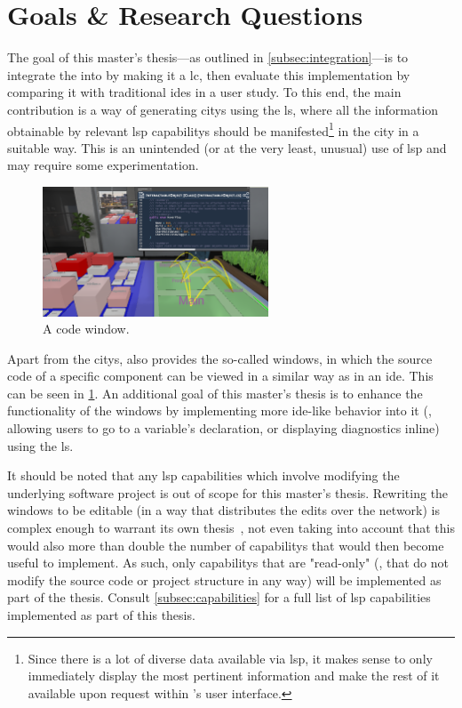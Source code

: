 \documentclass[../thesis]{subfiles}
\begin{document}
\section{Goals \& Research Questions}\label{sec:goals}
The goal of this master's thesis---as outlined in \cref{subsec:integration}---is to integrate the  into \SEE{} by making it a \gls{lc}, then evaluate this implementation by comparing it with traditional \glspl{ide} in a user study.
To this end, the main contribution is a way of generating \glspl{city} using the \gls{ls}, where all the information obtainable by relevant \gls{lsp} \glspl{capability} should be manifested\footnote{
	Since there is a lot of diverse data available via \gls{lsp}, it makes sense to only immediately display the most pertinent information and make the rest of it available upon request within \SEE{}'s user interface.
} in the city in a suitable way.
This is an unintended (or at the very least, unusual) use of \gls{lsp} and may require some experimentation.

\begin{figure}
	\centering
	\includegraphics[width=0.6\textwidth,trim={30.5cm 22cm 6cm 0},clip]{../figures/SEE_readme}
	\caption{A code window.}\label{fig:window}
\end{figure}

Apart from the \glspl{city}, \SEE{} also provides the so-called \glspl*{window}, in which the source code of a specific component can be viewed in a similar way as in an \gls{ide}.
This can be seen in \cref{fig:window}.
An additional goal of this master's thesis is to enhance the functionality of the \glspl{window} by implementing more \gls{ide}-like behavior into it (\eg, allowing users to go to a variable's declaration, or displaying diagnostics inline) using the \gls{ls}.

It should be noted that any \gls{lsp} capabilities which involve modifying the underlying software project is out of scope for this master's thesis.
Rewriting the \glspl{window} to be editable (in a way that distributes the edits over the network) is complex enough to warrant its own thesis~\cite[see also][]{moritz}, not even taking into account that this would also more than double the number of \glspl{capability} that would then become useful to implement.
As such, only \glspl{capability} that are "read-only" (\ie, that do not modify the source code or project structure in any way) will be implemented as part of the thesis.
Consult \cref{subsec:capabilities} for a full list of \gls{lsp} capabilities implemented as part of this thesis.
\end{document}
